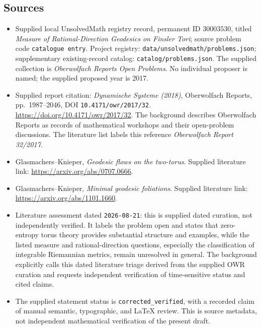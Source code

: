 \documentclass[11pt]{article}
\begin{document}
\subsection{Sources}
\begin{itemize}
\item Supplied local UnsolvedMath registry record, permanent ID \(30003530\), titled \emph{Measure of Rational-Direction Geodesics on Finsler Tori}; source problem code \texttt{catalogue entry}. Project registry: \texttt{data/unsolvedmath/problems.json}; supplementary existing-record catalog: \texttt{catalog/problems.json}. The supplied collection is \emph{Oberwolfach Reports Open Problems}. No individual proposer is named; the supplied proposed year is 2017.
\item Supplied report citation: \emph{Dynamische Systeme (2018)}, Oberwolfach Reports, pp.\ 1987--2046, DOI \texttt{10.4171/owr/2017/32}. \url{https://doi.org/10.4171/owr/2017/32}. The background describes Oberwolfach Reports as records of mathematical workshops and their open-problem discussions. The literature list labels this reference \emph{Oberwolfach Report 32/2017}.
\item Glasmachers--Knieper, \emph{Geodesic flows on the two-torus}. Supplied literature link: \url{https://arxiv.org/abs/0707.0666}.
\item Glasmachers--Knieper, \emph{Minimal geodesic foliations}. Supplied literature link: \url{https://arxiv.org/abs/1101.1660}.
\item Literature assessment dated \texttt{2026-08-21}: this is supplied dated curation, not independently verified. It labels the problem open and states that zero-entropy torus theory provides substantial structure and examples, while the listed measure and rational-direction questions, especially the classification of integrable Riemannian metrics, remain unresolved in general. The background explicitly calls this dated literature triage derived from the supplied OWR curation and requests independent verification of time-sensitive status and cited claims.
\item The supplied statement status is \texttt{corrected\_verified}, with a recorded claim of manual semantic, typographic, and LaTeX review. This is source metadata, not independent mathematical verification of the present draft.
\end{itemize}
\end{document}
